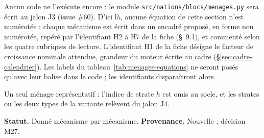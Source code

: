 \documentclass[11pt,a4paper]{article}
\begin{document}
\begin{proposee}
Aucun code ne l'exécute encore : le module \nolinkurl{src/nations/blocs/menages.py} sera écrit au jalon J3 (issue \#60). D'ici là, aucune équation de cette section n'est numérotée : chaque mécanisme est écrit dans un encadré proposé, en forme non numérotée, repéré par l'identifiant H2 à H7 de la fiche (\S~9.1), et commenté selon les quatre rubriques de lecture. L'identifiant H1 de la fiche désigne le facteur de croissance nominale attendue, grandeur du moteur écrite au cadre (\S\ref{sec:cadre-calendrier}). Les labels du tableau~\ref{tab:menages-equations} ne seront posés qu'avec leur balise dans le code ; les identifiants disparaîtront alors.

Un seul ménage représentatif : l'indice de strate $h$ est omis au socle, et les strates ou les deux types de la variante relèvent du jalon J4.

\textbf{Statut.} Donné mécanisme par mécanisme. \textbf{Provenance.} Nouvelle ; décision M27.
\end{proposee}
\end{document}
